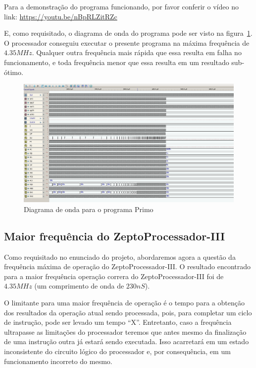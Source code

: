 \documentclass[12pt]{article}
\begin{document}
Para a demonstração do programa funcionando, por favor conferir o vídeo no link:
\href{https://youtu.be/nBpRLZitRZc}{https://youtu.be/nBpRLZitRZc}

E, como requisitado, o diagrama de onda do programa pode ser visto na
figura~\ref{fig:program__primo_wave.png}. O processador conseguiu executar o
presente programa na máxima frequência de $4.35MHz$. Qualquer outra frequência
mais rápida que essa resulta em falha no funcionamento, e toda frequência menor
que essa resulta em um resultado sub-ótimo.

\begin{figure}[H]
    \centering
    \includegraphics[width=.9\textwidth]{Projeto/images/program__primo_wave.png}
    \caption{Diagrama de onda para o programa Primo}\label{fig:program__primo_wave.png}
\end{figure}


\subsection{Maior frequência do ZeptoProcessador-III}\label{sec:programs:frequency}

Como requisitado no enunciado do projeto, abordaremos agora a questão da
frequência máxima de operação do ZeptoProcessador-III. O resultado encontrado
para a maior frequência operação correra do ZeptoProcessador-III foi de
$4.35MHz$ (um comprimento de onda de $230nS$).

O limitante para uma maior frequência de operação é o tempo para a obtenção dos
resultados da operação atual sendo processada, pois, para completar um ciclo de
instrução, pode ser levado um tempo ``X''. Entretanto, caso a frequência
ultrapasse as limitações do processador teremos que antes mesmo da finalização
de uma instrução outra já estará sendo executada. Isso acarretará em um estado
inconsistente do circuito lógico do processador e, por consequência, em um
funcionamento incorreto do mesmo.
\end{document}
